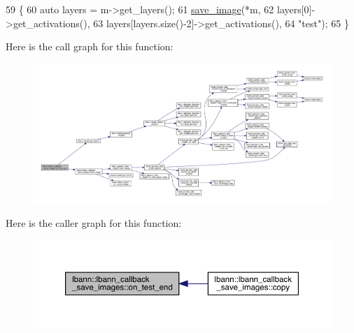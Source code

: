 \begin{DoxyCode}
59                                                      \{
60   \textcolor{keyword}{auto} layers = m->get\_layers();
61   \hyperlink{classlbann_1_1lbann__callback__save__images_ab84c4d511a4614ca90644d12dc77edee}{save\_image}(*m,
62              layers[0]->get\_activations(),
63              layers[layers.size()-2]->get\_activations(),
64              \textcolor{stringliteral}{"test"});
65 \}
\end{DoxyCode}
Here is the call graph for this function\+:\nopagebreak
\begin{figure}[H]
\begin{center}
\leavevmode
\includegraphics[width=350pt]{classlbann_1_1lbann__callback__save__images_a44d0f0113133d6fd8944d8b7702ea786_cgraph}
\end{center}
\end{figure}
Here is the caller graph for this function\+:\nopagebreak
\begin{figure}[H]
\begin{center}
\leavevmode
\includegraphics[width=350pt]{classlbann_1_1lbann__callback__save__images_a44d0f0113133d6fd8944d8b7702ea786_icgraph}
\end{center}
\end{figure}
\mbox{\label{classlbann_1_1lbann__callback__save__images_a79fcd1489f0a5239303578d892c7a8b9}} 
